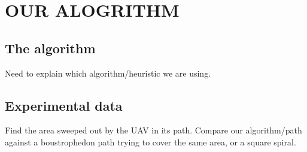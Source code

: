 \section {OUR ALOGRITHM}

\subsection {The algorithm}

Need to explain which algorithm/heuristic we are using.

\subsection {Experimental data}

Find the area sweeped out by the UAV in its path.
Compare our algorithm/path against a boustrophedon path trying to cover the same area, or a square spiral.
